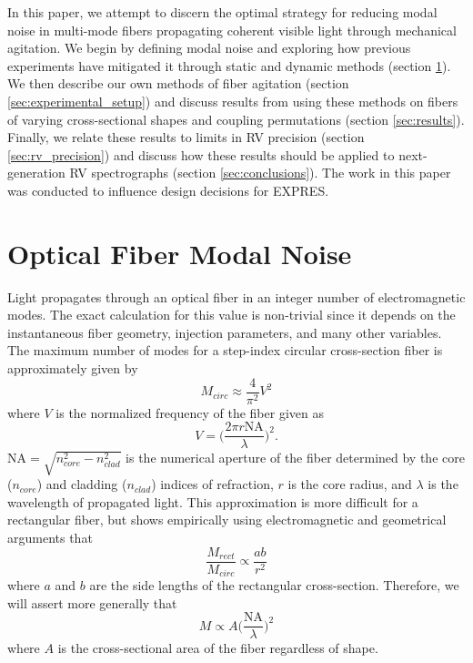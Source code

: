 \documentclass[twocolumn]{emulateapj}
\begin{document}
In this paper, we attempt to discern the optimal strategy for reducing modal noise in multi-mode fibers propagating coherent visible light through mechanical agitation. We begin by defining modal noise and exploring how previous experiments have mitigated it through static and dynamic methods (section \ref{sec:modal_noise_intro}). We then describe our own methods of fiber agitation (section \ref{sec:experimental_setup}) and discuss results from using these methods on fibers of varying cross-sectional shapes and coupling permutations (section \ref{sec:results}). Finally, we relate these results to limits in RV precision (section \ref{sec:rv_precision}) and discuss how these results should be applied to next-generation RV spectrographs (section \ref{sec:conclusions}). The work in this paper was conducted to influence design decisions for EXPRES.

\section{Optical Fiber Modal Noise}
\label{sec:modal_noise_intro}

Light propagates through an optical fiber in an integer number of electromagnetic modes. The exact calculation for this value is non-trivial since it depends on the instantaneous fiber geometry, injection parameters, and many other variables. The maximum number of modes for a step-index circular cross-section fiber is approximately given by
\begin{equation}
M_{circ} \approx \frac{4}{\pi ^2} V^2
\label{eq:max_modes}
\end{equation}
where $V$ is the normalized frequency of the fiber given as
\begin{equation}
V = \Bigg( \frac{2 \pi r \mathrm{NA}}{\lambda} \Bigg) ^2 .
\label{eq:norm_freq}
\end{equation}
$\mathrm{NA} = \sqrt{n_{core}^2 - n_{clad}^2}$ is the numerical aperture of the fiber determined by the core ($n_{core}$) and cladding ($n_{clad}$) indices of refraction, $r$ is the core radius, and $\lambda$ is the wavelength of propagated light. This approximation is more difficult for a rectangular fiber, but \citet{Nikitin2011} shows empirically using electromagnetic and geometrical arguments that
\begin{equation}
\frac{M_{rect}}{M_{circ}} \propto \frac{ab}{r^2}
\label{eq:prop_modes}
\end{equation}
where $a$ and $b$ are the side lengths of the rectangular cross-section. Therefore, we will assert more generally that
\begin{equation}
M \propto A \Bigg( \frac{\mathrm{NA}}{\lambda} \Bigg) ^2
\label{eq:mode_area}
\end{equation}
where $A$ is the cross-sectional area of the fiber regardless of shape.
\end{document}
